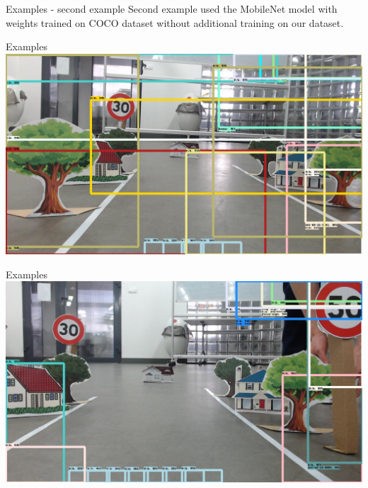 \documentclass[aspectratio=1610,english]{beamer} %
\begin{document}
  	\begin{frame}{Examples - second example}
		Second example used the MobileNet model with weights trained on COCO dataset without additional training on our dataset.
	\end{frame}
  	\begin{frame}{Examples}
		\includegraphics[scale=0.3]{examples/no_retraining_of_stock_model/session_one-6.jpg}
	\end{frame}
  	\begin{frame}{Examples}
		\includegraphics[scale=0.3]{examples/no_retraining_of_stock_model/session_one-10.jpg}
	\end{frame}
	
\end{document}
